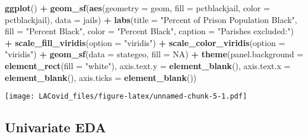 \documentclass[
]{article}
\newenvironment{Shaded}{\begin{snugshade}}{\end{snugshade}}
\newcommand{\DataTypeTok}[1]{\textcolor[rgb]{0.13,0.29,0.53}{#1}}
\newcommand{\FloatTok}[1]{\textcolor[rgb]{0.00,0.00,0.81}{#1}}
\newcommand{\KeywordTok}[1]{\textcolor[rgb]{0.13,0.29,0.53}{\textbf{#1}}}
\newcommand{\NormalTok}[1]{#1}
\newcommand{\OperatorTok}[1]{\textcolor[rgb]{0.81,0.36,0.00}{\textbf{#1}}}
\newcommand{\OtherTok}[1]{\textcolor[rgb]{0.56,0.35,0.01}{#1}}
\newcommand{\StringTok}[1]{\textcolor[rgb]{0.31,0.60,0.02}{#1}}
\begin{document}
\begin{Shaded}
\begin{Highlighting}[]
\KeywordTok{ggplot}\NormalTok{() }\OperatorTok{+}
\StringTok{  }\KeywordTok{geom_sf}\NormalTok{(}\KeywordTok{aes}\NormalTok{(}\DataTypeTok{geometry =}\NormalTok{ geom, }\DataTypeTok{fill =}\NormalTok{ pctblackjail, }\DataTypeTok{color =}\NormalTok{ pctblackjail), }\DataTypeTok{data =}\NormalTok{ jails) }\OperatorTok{+}
\StringTok{  }\KeywordTok{labs}\NormalTok{(}\DataTypeTok{title =} \StringTok{"Percent of Prison Population Black"}\NormalTok{,}
       \DataTypeTok{fill =} \StringTok{"Percent Black"}\NormalTok{,}
       \DataTypeTok{color =} \StringTok{"Percent Black"}\NormalTok{,}
       \DataTypeTok{caption =} \StringTok{"Parishes excluded:"}\NormalTok{) }\OperatorTok{+}\StringTok{ }
\StringTok{  }\KeywordTok{scale_fill_viridis}\NormalTok{(}\DataTypeTok{option =} \StringTok{"viridis"}\NormalTok{) }\OperatorTok{+}\StringTok{ }
\StringTok{  }\KeywordTok{scale_color_viridis}\NormalTok{(}\DataTypeTok{option =} \StringTok{"viridis"}\NormalTok{) }\OperatorTok{+}
\StringTok{  }\KeywordTok{geom_sf}\NormalTok{(}\DataTypeTok{data =}\NormalTok{ stategeo, }\DataTypeTok{fill =} \OtherTok{NA}\NormalTok{) }\OperatorTok{+}
\StringTok{  }\KeywordTok{theme}\NormalTok{(}\DataTypeTok{panel.background =} \KeywordTok{element_rect}\NormalTok{(}\DataTypeTok{fill =} \StringTok{"white"}\NormalTok{),}
        \DataTypeTok{axis.text.y =} \KeywordTok{element_blank}\NormalTok{(),}
        \DataTypeTok{axis.text.x =} \KeywordTok{element_blank}\NormalTok{(),}
        \DataTypeTok{axis.ticks =} \KeywordTok{element_blank}\NormalTok{()) }
\end{Highlighting}
\end{Shaded}

\texttt{[image: LACovid\_files/figure-latex/unnamed-chunk-5-1.pdf]}

\hypertarget{univariate-eda}{%
\subsection{Univariate EDA}\label{univariate-eda}}

\begin{Shaded}
\end{Shaded}
\end{document}
